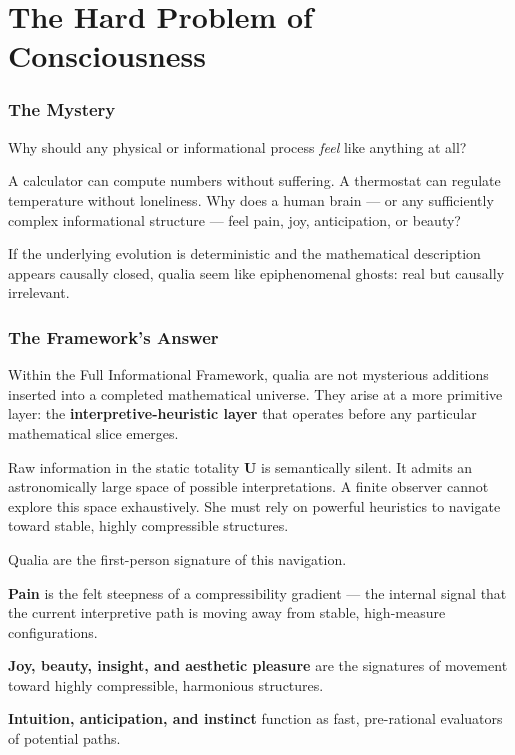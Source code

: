 
\chapter{The Hard Problem of Consciousness}
\label{chap:the-hard-problem}

\subsection*{The Mystery}

Why should any physical or informational process \textit{feel} like anything at all?

A calculator can compute numbers without suffering.
A thermostat can regulate temperature without loneliness.
Why does a human brain — or any sufficiently complex informational structure — feel pain, joy, anticipation, or beauty?

If the underlying evolution is deterministic and the mathematical description appears causally closed, qualia seem like epiphenomenal ghosts: real but causally irrelevant.

\subsection*{The Framework's Answer}

Within the Full Informational Framework, qualia are not mysterious additions inserted into a completed mathematical universe.
They arise at a more primitive layer: the \textbf{interpretive-heuristic layer} that operates before any particular mathematical slice emerges.

Raw information in the static totality $\mathbf{U}$ is semantically silent.
It admits an astronomically large space of possible interpretations.
A finite observer cannot explore this space exhaustively.
She must rely on powerful heuristics to navigate toward stable, highly compressible structures.

Qualia are the first-person signature of this navigation.

\textbf{Pain} is the felt steepness of a compressibility gradient — the internal signal that the current interpretive path is moving away from stable, high-measure configurations.

\textbf{Joy, beauty, insight, and aesthetic pleasure} are the signatures of movement toward highly compressible, harmonious structures.

\textbf{Intuition, anticipation, and instinct} function as fast, pre-rational evaluators of potential paths.

